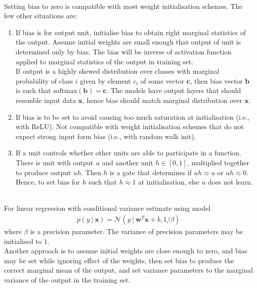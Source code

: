 \begin{remark} \\
Setting bias to zero is compatible with most weight initialisation schemes. The few other situations are:
\begin{enumerate}[label=\roman*.]
\setlength{\itemsep}{0pt}
\item If bias is for output unit, initialise bias to obtain right marginal statistics of the output. Assume initial weights are small enough that output of unit is determined only by bias. The bias will be inverse of activation function applied to marginal statistics of the output in training set.\\
If output is a highly skewed distribution over classes with marginal probability of class $i$ given by element $c_i$ of some vector $\bm{c}$, then bias vector $\bm{b}$ is such that $\text{softmax}(\bm{b}) = \bm{c}$. The models have output layers that should resemble input data $\bm{x}$, hence bias should match marginal distribution over $\bm{x}$.
\item If bias is to be set to avoid causing too much saturation at initialisation (i.e., with ReLU). Not compatible with weight initialisation schemes that do not expect strong input form bias (i.e., with random walk init).
\item If a unit controls whether other units are able to participate in a function. There is unit with output $u$ and another unit $h \in [0,1]$, multiplied together to produce output $uh$. Then $h$ is a gate that determines if $uh \approx u$ or $uh \approx 0$. Hence, to set bias for $h$ such that $h \approx 1$ at initialisation, else $u$ does not learn.
\end{enumerate}
\end{remark}

\begin{remark} \\
For linear regression with conditional variance estimate using model
\begin{align}
p(y \ | \ \bm{x}) = \mathcal{N}(y \ | \ \bm{w}^T \bm{x} + b, 1/\beta) \nonumber
\end{align}
where $\beta$ is a precision parameter. The variance of precision parameters may be initialised to $1$.\\
Another approach is to assume initial weights are close enough to zero, and bias may be set while ignoring effect of the weights, then set bias to produce the correct marginal mean of the output, and set variance parameters to the marginal variance of the output in the training set.
\end{remark}

